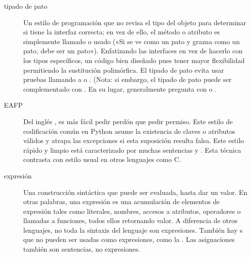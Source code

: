 \documentclass[a4,10pt,spanish]{sphinxmanual}
\begin{document}
\begin{description}
\item[{tipado de pato\label{\detokenize{glossary:term-duck-typing}}}] \leavevmode
\sphinxAtStartPar
Un estilo de programación que no revisa el tipo del objeto para determinar si tiene la interfaz correcta; en vez de ello, el método o atributo es simplemente llamado o usado («Si se ve como un pato y grazna como un pato, debe ser un pato»).  Enfatizando las interfaces en vez de hacerlo con los tipos específicos, un código bien diseñado pues tener mayor flexibilidad permitiendo la sustitución polimórfica.  El tipado de pato  evita usar pruebas llamando a  o .  (Nota: si embargo, el tipado de pato puede ser complementado con {\hyperref[\detokenize{glossary:term-abstract-base-class}]{}}. En su lugar, generalmente pregunta con  o {\hyperref[\detokenize{glossary:term-EAFP}]{}}.

\item[{EAFP\label{\detokenize{glossary:term-EAFP}}}] \leavevmode
\sphinxAtStartPar
Del inglés , es más fácil pedir perdón que pedir permiso.  Este estilo de codificación común en Python asume la existencia de claves o atributos válidos y atrapa las excepciones si esta suposición resulta falsa.  Este estilo rápido y limpio está caracterizado por muchas sentencias  y .  Esta técnica contrasta con estilo {\hyperref[\detokenize{glossary:term-LBYL}]{}} usual en otros lenguajes como C.

\item[{expresión\label{\detokenize{glossary:term-expression}}}] \leavevmode
\sphinxAtStartPar
Una construcción sintáctica que puede ser evaluada, hasta dar un valor.  En otras palabras, una expresión es una acumulación de elementos de expresión tales como literales, nombres, accesos a atributos, operadores o llamadas a funciones, todos ellos retornando valor.  A diferencia de otros lenguajes, no toda la sintaxis del lenguaje son expresiones. También hay {\hyperref[\detokenize{glossary:term-statement}]{}}s que no pueden ser usadas como expresiones, como la .  Las asignaciones también son sentencias, no expresiones.


\end{description}
\end{document}
